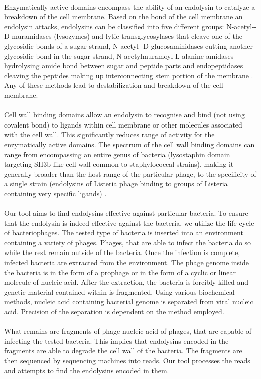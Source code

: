 \paragraph*{}
Enzymatically active domains encompass the ability of an endolysin to catalyze a breakdown of the cell membrane. Based on the bond of the cell membrane an endolysin attacks, endolysins can be classified into five different groups: N-acetyl-\textbeta-D-muramidases (lysozymes) and lytic transglycosylases that cleave one of the glycosidic bonds of a sugar strand, N-acetyl-\textbeta-D-glucosaminidases cutting another glycosidic bond in the sugar strand, N-acetylmuramoyl-L-alanine amidases hydrolysing amide bond between sugar and peptide parts and endopeptidases cleaving the peptides making up interconnecting stem portion of the membrane \cite{schmelcher2012bacteriophage}. Any of these methods lead to destabilization and breakdown of the cell membrane.
\paragraph*{}
Cell wall binding domains allow an endolysin to recognise and bind (not using covalent bond) to ligands within cell membrane or other molecules associated with the cell wall. This significantly reduces range of activity for the enzymatically active domains. The spectrum of the cell wall binding domains can range from encompassing an entire genus of bacteria (lysostaphin domain targeting SH3b-like cell wall common to staphylococcal strains), making it generally broader than the host range of the particular phage, to the specificity of a single strain (endolysins of Listeria phage binding to groups of Listeria containing very specific ligands) \cite{schmelcher2012bacteriophage}.
\paragraph*{}
Our tool aims to find endolysins effective against particular bacteria. To ensure that the endolysin is indeed effective against the bacteria, we utilize the life cycle of bacteriophages. The tested type of bacteria is inserted into an environment containing a variety of phages. Phages, that are able to infect the bacteria do so while the rest remain outside of the bacteria. Once the infection is complete, infected bacteria are extracted from the environment. The phage genome inside the bacteria is in the form of a prophage or in the form of a cyclic or linear molecule of nucleic acid. After the extraction, the bacteria is forcibly killed and genetic material contained within is fragmented. Using various biochemical methods, nucleic acid containing bacterial genome is separated from viral nucleic acid. Precision of the separation is dependent on the method employed.
\paragraph*{}
What remains are fragments of phage nucleic acid of phages, that are capable of infecting the tested bacteria. This implies that endolysins encoded in the fragments are able to degrade the cell wall of the bacteria. The fragments are then sequenced by sequencing machines into reads. Our tool processes the reads and attempts to find the endolysins encoded in them.
